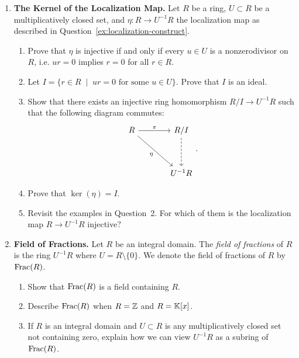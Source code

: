 \documentclass[12pt,reqno]{amsart}
\begin{document}
\begin{enumerate}[leftmargin=*]
\item \textbf{The Kernel of the Localization Map.} Let $R$ be a ring, $U\subset R$ be a multiplicatively closed set, and $\eta:R \to U^{-1}R$ the localization map as described in Question~\ref{ex:localization-construct}.
\begin{enumerate}
	\item Prove that $\eta$ is injective if and only if every $u\in U$ is a nonzerodivisor on $R$, i.e. $ur=0$ implies $r=0$ for all $r\in R$.	
	\item Let $I=\{r \in R \;\; | \;\; ur = 0 \text{ for some $u \in U$}\}$. Prove that $I$ is an ideal. 
	\item Show that there exists an injective ring homomorphism $R/I \to U^{-1}R$ such that the following diagram commutes:
	\[
	\begin{tikzcd}[row sep = 3.5em, column sep = 3.5em]
	R \arrow[r, "\pi"] \arrow[dr, swap,"\eta"] & R/I \arrow[d,dashed] \\
	& U^{-1}R
	\end{tikzcd}.
	\]
	\item Prove that $\ker(\eta)=I$. 
	\item  Revisit the examples in Question~2. For which of them is the localization map $R\to U^{-1}R$ injective?
\end{enumerate}

\item \textbf{Field of Fractions.} Let $R$ be an integral domain. The \emph{field of fractions} of $R$ is the ring $U^{-1}R$ where $U=R\setminus\{0\}$. We denote the field of fractions of $R$ by $\operatorname{Frac}(R)$.
\begin{enumerate}
	\item Show that $\operatorname{Frac}(R)$ is a field containing $R$.
	\item Describe $\operatorname{Frac}(R)$ when $R=\mathbb{Z}$ and $R=\mathbb{K}[x]$.
	\item If $R$ is an integral domain and $U \subset R$ is any multiplicatively closed set not containing zero, explain how we can view $U^{-1}R$ as a subring of $\operatorname{Frac}(R)$. 
\end{enumerate}


\end{enumerate}
\end{document}
